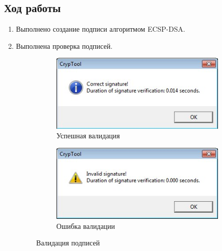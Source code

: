 \documentclass[a4paper, 14pt]{extarticle}
\begin{document}
\subsection{Ход работы}
\begin{enumerate}
    \item Выполнено создание подписи алгоритмом ECSP-DSA.\@
        
    \item Выполнена проверка подписей.
        \begin{figure}[h]
            \centering
            \begin{subfigure}[b]{0.42\textwidth}
                \includegraphics[width=\textwidth]{img/S005.jpg}
                \caption{Успешная валидация}
            \end{subfigure}%
            \hspace{1cm}
            \begin{subfigure}[b]{0.42\textwidth}
                \includegraphics[width=\textwidth]{img/S006.jpg}
                \caption{Ошибка валидации}
            \end{subfigure}
            \caption{Валидация подписей}
        \end{figure}
        \FloatBarrier{}


\end{enumerate}
\end{document}

